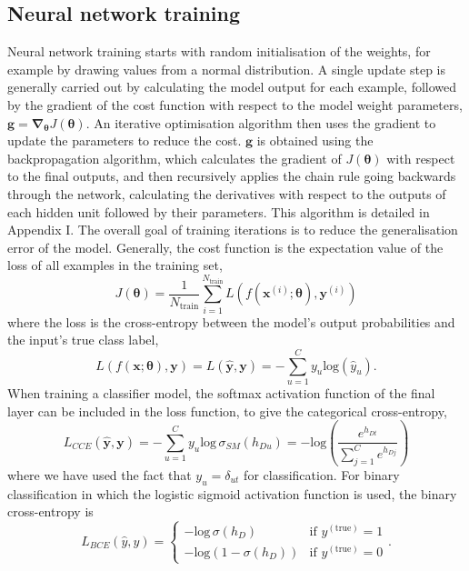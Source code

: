 \documentclass[12pt]{article}
\begin{document}
\subsection{Neural network training}
Neural network training starts with random initialisation of the weights, for example by drawing values from a normal distribution. A single update step is generally carried out by calculating the model output for each example, followed by the gradient of the cost function with respect to the model weight parameters, $\bm{g}=\bm\nabla_{\bm\theta}J(\bm\theta)$. An iterative optimisation algorithm then uses the gradient to update the parameters to reduce the cost. $\bm{g}$ is obtained using the backpropagation algorithm, which calculates the gradient of $J(\bm\theta)$ with respect to the final outputs, and then recursively applies the chain rule going backwards through the network, calculating the derivatives with respect to the outputs of each hidden unit followed by their parameters. This algorithm is detailed in Appendix I. The overall goal of training iterations is to reduce the generalisation error of the model. Generally, the cost function is the expectation value of the loss of all examples in the training set,
\begin{equation}
J(\boldsymbol\theta)=\frac{1}{N_{\mathrm{train}}}\sum_{i=1}^{N_{\mathrm{train}}}L(f(\bm{x}^{(i)};\boldsymbol\theta),\bm{y}^{(i)})
\end{equation}
where the loss is the cross-entropy between the model's output probabilities and the input's true class label,
\begin{equation}
L(f(\bm{x};\boldsymbol\theta),\bm{y})=L(\hat{\bm{y}},\bm{y})=-\sum_{u=1}^Cy_u\mathrm{log}(\hat{y}_u).
\end{equation}
When training a classifier model, the softmax activation function of the final layer can be included in the loss function, to give the categorical cross-entropy,
\begin{equation}
L_{CCE}(\hat{\bm{y}},\bm{y})=-\sum_{u=1}^Cy_u\mathrm{log}\,\sigma_{SM}(h_{Du})=-\mathrm{log}\left(\frac{e^{h_{Dt}}}{\sum_{j=1}^{C}e^{h_{Dj}}}\right)
\end{equation}
where we have used the fact that $y_u=\delta_{ut}$ for classification. For binary classification in which the logistic sigmoid activation function is used, the binary cross-entropy is
\begin{equation}
L_{BCE}(\hat{y},y)=
\left\{
\begin{array}{ll}
-\mathrm{log}\,\sigma(h_D)  & \mbox{if } y^{(\mathrm{true})}=1 \\
-\mathrm{log}\left(1-\sigma(h_D)\right) & \mbox{if } y^{(\mathrm{true})}=0
\end{array}
\right..
\end{equation}
\end{document}
